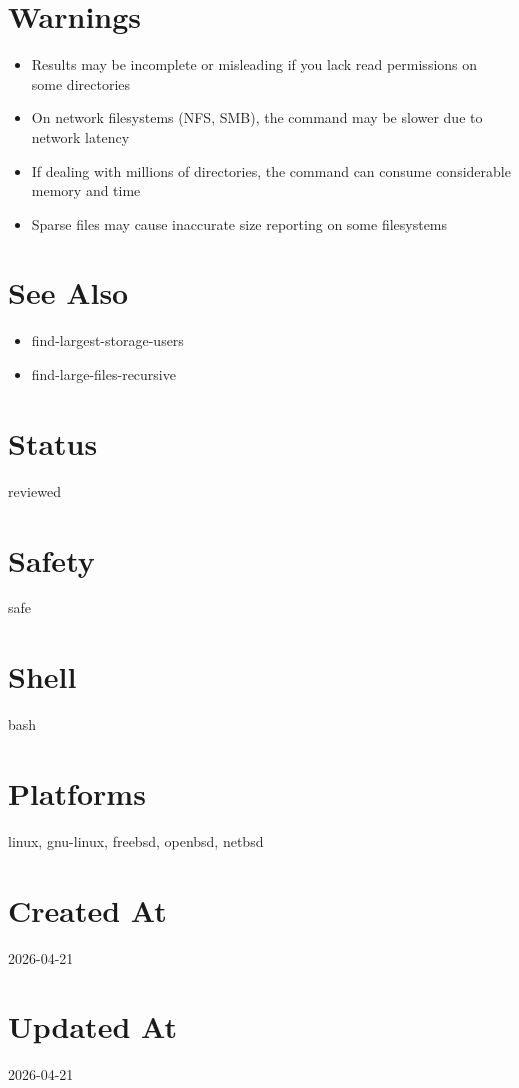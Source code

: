 \documentclass{article}
\begin{document}
\section*{Warnings}
\begin{itemize}
  \item Results may be incomplete or misleading if you lack read permissions on some directories
  \item On network filesystems (NFS, SMB), the command may be slower due to network latency
  \item If dealing with millions of directories, the command can consume considerable memory and time
  \item Sparse files may cause inaccurate size reporting on some filesystems
\end{itemize}

\section*{See Also}
\begin{itemize}
  \item find-largest-storage-users
  \item find-large-files-recursive
\end{itemize}

\section*{Status}
reviewed

\section*{Safety}
safe

\section*{Shell}
bash

\section*{Platforms}
linux, gnu-linux, freebsd, openbsd, netbsd

\section*{Created At}
2026-04-21

\section*{Updated At}
2026-04-21
\end{document}
